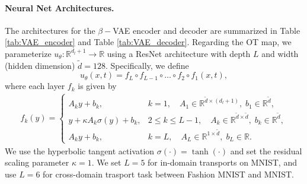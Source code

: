 \documentclass{article} %
\theoremstyle{plain}
\theoremstyle{definition}
\theoremstyle{remark}
\begin{document}
\paragraph{Neural Net Architectures.} The architectures for the $\beta-$VAE encoder and decoder are summarized in Table \ref{tab:VAE_encoder} and Table \ref{tab:VAE_decoder}. Regarding the OT map, we parameterize $u_\theta: \mathbb{R}^{d_l+1} \to \mathbb{R}$ using a ResNet architecture \cite{He_2016_CVPR} with depth $L$ and width (hidden dimension) $\widetilde{d}=128$. Specifically, we define
\begin{equation*}
  u_\theta(x,t) 
  = f_L \circ f_{L-1} \circ \dots \circ f_2 \circ f_1(x,t),
\end{equation*}
where each layer $f_k$ is given by
\begin{align*}
  f_k(y) =
  \begin{cases}
      A_k y + b_k, & k=1, \quad A_1 \in \mathbb{R}^{\widetilde{d} \times (d_l+1)},\; b_1 \in \mathbb{R}^{\widetilde{d}}, \\[6pt]
      y + \kappa A_k \sigma(y) + b_k, & 2 \leq k \leq L-1, \quad A_k \in \mathbb{R}^{\widetilde{d} \times \widetilde{d}},\; b_k \in \mathbb{R}^{\widetilde{d}}, \\[6pt]
      A_k y + b_k, & k=L, \quad A_L \in \mathbb{R}^{1 \times \widetilde{d}},\; b_L \in \mathbb{R}.
  \end{cases}
\end{align*}
We use the hyperbolic tangent activation $\sigma(\cdot) = \tanh(\cdot)$ and set the residual scaling parameter $\kappa = 1$. We set $L=5$ for in-domain transports on MNIST, and use $L=6$ for cross-domain trasport task between Fashion MNIST and MNIST.
\end{document}
